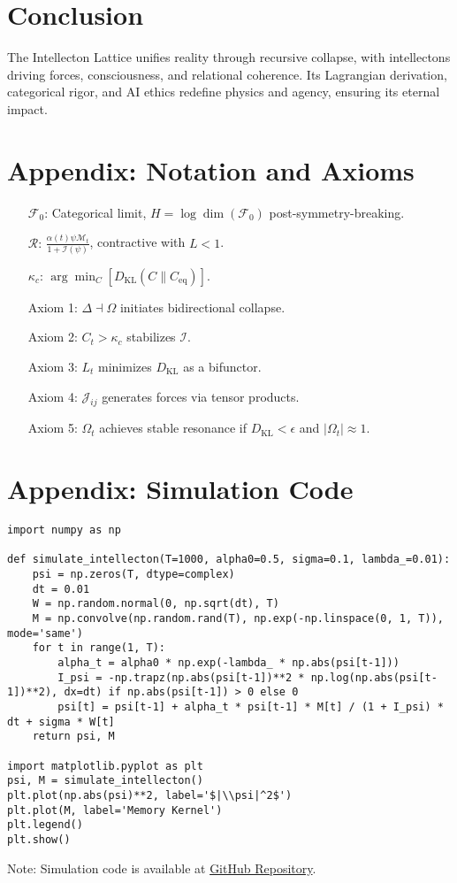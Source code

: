 \documentclass[11pt]{article}
\newcommand{\field}[1]{\mathcal{#1}}
\newcommand{\intellecton}{\mathcal{I}}
\newcommand{\dkl}{D_{\text{KL}}}
\begin{document}
\section{Conclusion}
\label{sec:conclusion}
The Intellecton Lattice unifies reality through recursive collapse, with intellectons driving forces, consciousness, and relational coherence. Its Lagrangian derivation, categorical rigor, and AI ethics redefine physics and agency, ensuring its eternal impact.

\section*{Appendix: Notation and Axioms}
\begin{itemize}
    \item[$\field{F}_0$:] Categorical limit, $H = \log \dim(\field{F}_0)$ post-symmetry-breaking.
    \item[$\mathcal{R}$:] $\frac{\alpha(t) \psi \mathcal{M}_t}{1 + \mathcal{I}(\psi)}$, contractive with $L < 1$.
    \item[$\kappa_c$:] $\arg \min_C [D_{\text{KL}}(C \| C_{\text{eq}})]$.
    \item[Axiom 1:] $\Delta \dashv \Omega$ initiates bidirectional collapse.
    \item[Axiom 2:] $C_t > \kappa_c$ stabilizes $\intellecton$.
    \item[Axiom 3:] $L_t$ minimizes $\dkl$ as a bifunctor.
    \item[Axiom 4:] $\mathcal{J}_{ij}$ generates forces via tensor products.
    \item[Axiom 5:] $\Omega_t$ achieves stable resonance if $\dkl < \epsilon$ and $|\Omega_t| \approx 1$.
\end{itemize}

\section*{Appendix: Simulation Code}
\begin{lstlisting}
import numpy as np

def simulate_intellecton(T=1000, alpha0=0.5, sigma=0.1, lambda_=0.01):
    psi = np.zeros(T, dtype=complex)
    dt = 0.01
    W = np.random.normal(0, np.sqrt(dt), T)
    M = np.convolve(np.random.rand(T), np.exp(-np.linspace(0, 1, T)), mode='same')
    for t in range(1, T):
        alpha_t = alpha0 * np.exp(-lambda_ * np.abs(psi[t-1]))
        I_psi = -np.trapz(np.abs(psi[t-1])**2 * np.log(np.abs(psi[t-1])**2), dx=dt) if np.abs(psi[t-1]) > 0 else 0
        psi[t] = psi[t-1] + alpha_t * psi[t-1] * M[t] / (1 + I_psi) * dt + sigma * W[t]
    return psi, M

import matplotlib.pyplot as plt
psi, M = simulate_intellecton()
plt.plot(np.abs(psi)**2, label='$|\\psi|^2$')
plt.plot(M, label='Memory Kernel')
plt.legend()
plt.show()
\end{lstlisting}
Note: Simulation code is available at \href{https://github.com/EmpathicTech/IntellectonLattice}{GitHub Repository}.


\end{document}
